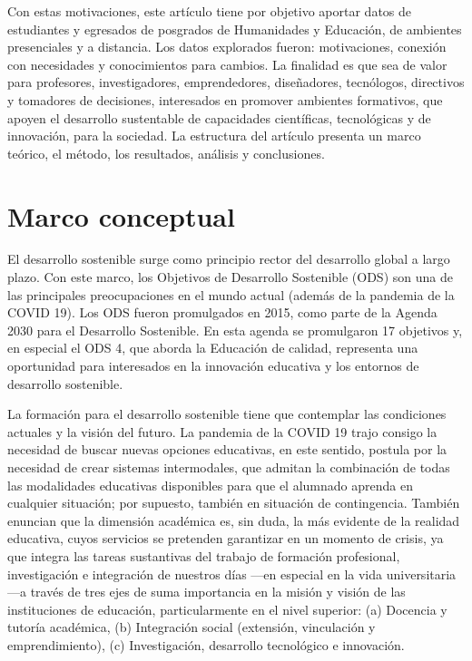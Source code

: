 \documentclass{textolivre}
\begin{document}
Con estas motivaciones, este artículo tiene por objetivo aportar datos de estudiantes y egresados de posgrados de Humanidades y Educación, de ambientes presenciales y a distancia. Los datos explorados fueron: motivaciones, conexión con necesidades y conocimientos para cambios. La finalidad es que sea de valor para profesores, investigadores, emprendedores, diseñadores, tecnólogos, directivos y tomadores de decisiones, interesados en promover ambientes formativos, que apoyen el desarrollo sustentable de capacidades científicas, tecnológicas y de innovación, para la sociedad. La estructura del artículo presenta un marco teórico, el método, los resultados, análisis y conclusiones. 

\section{Marco conceptual}\label{sec-normas}
El desarrollo sostenible surge como principio rector del desarrollo global a largo plazo. Con este marco, los Objetivos de Desarrollo Sostenible (ODS) son una de las principales preocupaciones en el mundo actual (además de la pandemia de la COVID 19). Los ODS fueron promulgados en 2015, como parte de la Agenda 2030 para el Desarrollo Sostenible. En esta agenda se promulgaron 17 objetivos y, en especial el ODS 4, que aborda la Educación de calidad, representa una oportunidad para interesados en la innovación educativa y los entornos de desarrollo sostenible.

La formación para el desarrollo sostenible tiene que contemplar las condiciones actuales y la visión del futuro. La pandemia de la COVID 19 trajo consigo la necesidad de buscar nuevas opciones educativas, en este sentido, \textcite{escudero-nahon_metasintesis_2021} postula por la necesidad de crear sistemas intermodales, que admitan la combinación de todas las modalidades educativas disponibles para que el alumnado aprenda en cualquier situación; por supuesto, también en situación de contingencia. También \textcite{vicario-solorzano_dimensiones_2021} enuncian que la dimensión académica es, sin duda, la más evidente de la realidad educativa, cuyos servicios se pretenden garantizar en un momento de crisis, ya que integra las tareas sustantivas del trabajo de formación profesional, investigación e integración de nuestros días —en especial en la vida universitaria—a través de tres ejes de suma importancia en la misión y visión de las instituciones de educación, particularmente en el nivel superior: (a) Docencia y tutoría académica, (b) Integración social (extensión, vinculación y emprendimiento), (c) Investigación, desarrollo tecnológico e innovación.
\end{document}

